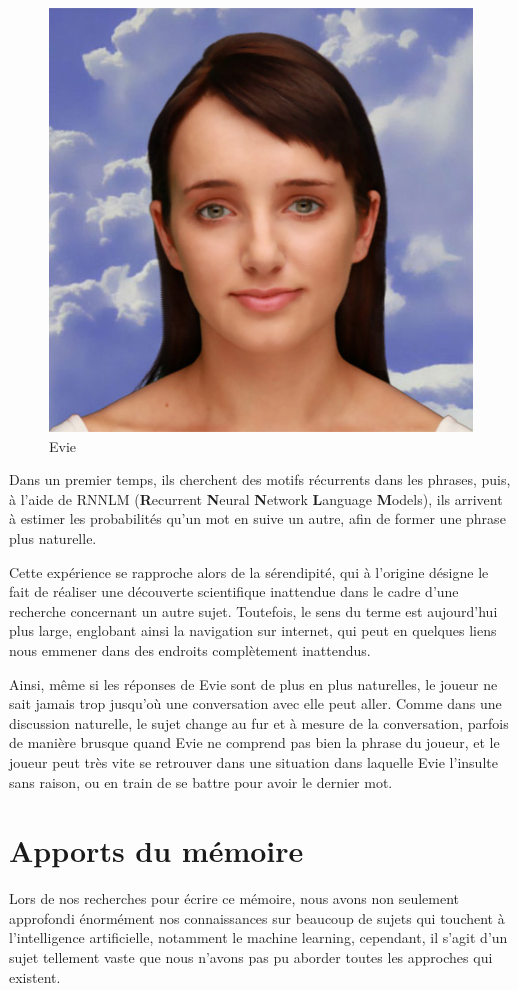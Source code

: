 \documentclass[a4paper, 12pt]{article} %
\begin{document}
\begin{figure}[!h]%
	\begin{center} 
		\includegraphics[width=0.40\columnwidth]{images/evie.png}%
		\caption{Evie}%
	\end{center}
\end{figure}

Dans un premier temps, ils cherchent  des motifs récurrents dans les phrases, puis, à l’aide de RNNLM (\textbf{R}ecurrent \textbf{N}eural \textbf{N}etwork \textbf{L}anguage \textbf{M}odels), ils arrivent à  estimer les probabilités qu'un mot en suive un autre, afin de former une phrase plus naturelle.

Cette expérience se rapproche alors de la sérendipité\cite{serendipite}, qui à l'origine désigne le fait de réaliser une découverte scientifique inattendue dans le cadre d'une recherche concernant un autre sujet. Toutefois, le sens du terme est aujourd'hui plus large, englobant ainsi la navigation sur internet, qui peut en quelques liens nous emmener dans des endroits complètement inattendus.

Ainsi, même si les réponses de Evie sont de plus en plus naturelles, le joueur ne sait jamais trop jusqu'où une conversation avec elle peut aller. Comme dans une discussion naturelle, le sujet change au fur et à mesure de la conversation, parfois de manière brusque quand Evie ne comprend pas bien la phrase du joueur, et le joueur peut très vite se retrouver dans une situation dans laquelle Evie l'insulte sans raison, ou en train de se battre pour avoir le dernier mot.


\newpage
\section{Apports du mémoire}

Lors de nos recherches pour écrire ce mémoire, nous avons non seulement approfondi énormément nos connaissances sur beaucoup de sujets qui touchent à l'intelligence artificielle, notamment le machine learning, cependant, il s'agit d'un sujet tellement vaste que nous n'avons pas pu aborder toutes les approches qui existent.
\end{document}
